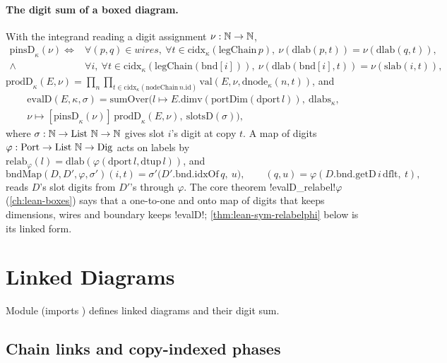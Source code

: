 \paragraph{The digit sum of a boxed diagram.} With the integrand reading a digit assignment $\nu:\mathbb{N}\to\mathbb{N}$,
\begin{align*}
\mathrm{pinsD}_\kappa(\nu)\iff{}&\forall (p,q)\in\mathit{wires},\ \forall t\in\mathrm{cidx}_\kappa(\mathrm{legChain}\,p),\ \nu(\mathrm{dlab}(p,t))=\nu(\mathrm{dlab}(q,t)),\\
\land{}&\forall i,\ \forall t\in\mathrm{cidx}_\kappa(\mathrm{legChain}(\mathrm{bnd}[i])),\ \nu(\mathrm{dlab}(\mathrm{bnd}[i],t))=\nu(\mathrm{slab}(i,t)),
\end{align*}
$\mathrm{prodD}_\kappa(E,\nu)=\prod_{n}\prod_{t\in\mathrm{cidx}_\kappa(\mathrm{nodeChain}\,n.\mathrm{id})}\mathrm{val}(E,\nu,\mathrm{dnode}_\kappa(n,t))$, and
\begin{multline*}
\mathrm{evalD}(E,\kappa,\sigma)=\mathrm{sumOver}\bigl(l\mapsto E.\mathrm{dimv}(\mathrm{portDim}(\mathrm{dport}\,l)),\ \mathrm{dlabs}_\kappa,\\ \nu\mapsto[\mathrm{pinsD}_\kappa(\nu)]\,\mathrm{prodD}_\kappa(E,\nu),\ \mathrm{slotsD}(\sigma)\bigr),
\end{multline*}
where $\sigma:\mathbb{N}\to\text{List }\mathbb{N}\to\mathbb{N}$ gives slot $i$'s digit at copy $t$. A map of digits $\varphi:\mathrm{Port}\to\text{List }\mathbb{N}\to\mathrm{Dig}$ acts on labels by $\mathrm{relab}_\varphi(l)=\mathrm{dlab}(\varphi(\mathrm{dport}\,l,\mathrm{dtup}\,l))$, and
\[
\mathrm{bndMap}(D,D',\varphi,\sigma')(i,t)=\sigma'\bigl(D'.\mathrm{bnd.idxOf}\,q,\ u\bigr),\qquad (q,u)=\varphi(D.\mathrm{bnd.getD}\,i\,\mathrm{dflt},\ t),
\]
reads $D$'s slot digits from $D'$'s through $\varphi$. The core theorem \lean!evalD_relabel!$\varphi$ (\cref{ch:lean-boxes}) says that a one-to-one and onto map of digits that keeps dimensions, wires and boundary keeps \lean!evalD!; \cref{thm:lean-sym-relabelphi} below is its linked form.

\section{Linked Diagrams}\label{sec:lean-sym-linked}

Module  (imports ) defines linked diagrams and their digit sum.

\subsection{Chain links and copy-indexed phases}

